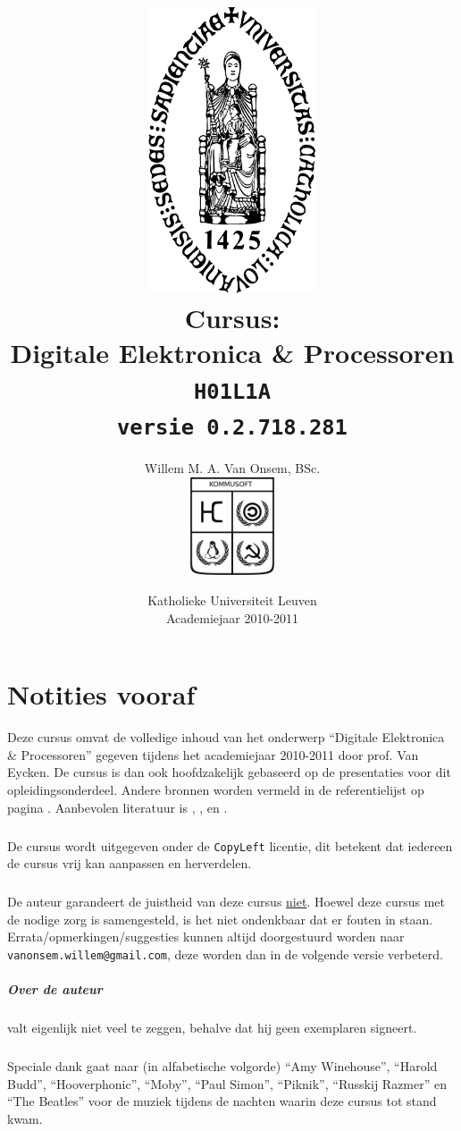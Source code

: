 \documentclass[a4paper,10pt,titlepage]{book}
\title{\includegraphics[width=5cm]{../SharedData/sedes.pdf}\\Cursus:\\Digitale Elektronica \& Processoren\\\texttt{H01L1A}\\\texttt{\small versie 0.2.718.281}}
\author{Willem M. A. Van Onsem, BSc.\\\includegraphics[width=2.5cm]{../SharedData/kommusoftEmblema.pdf}}
\date{Katholieke Universiteit Leuven\\Academiejaar 2010-2011}
\begin{document}
\frontmatter
\begin{titlepage}
\maketitle
\end{titlepage}
\tableofcontents
\chapter*{Notities vooraf}
\begin{it}
Deze cursus omvat de volledige inhoud van het onderwerp ``Digitale Elektronica \& Processoren'' gegeven tijdens het academiejaar 2010-2011 door prof. Van Eycken. De cursus is dan ook hoofdzakelijk gebaseerd op de presentaties voor dit opleidingsonderdeel. Andere bronnen worden vermeld in de referentielijst op pagina \pageref{reference}. Aanbevolen literatuur is \cite{brown2004fundamentals}, \cite{gajski1997principles}, \cite{wakerly2000digital} en \cite{ashenden2008designer}.
\paragraph{}
De cursus wordt uitgegeven onder de \texttt{CopyLeft} licentie, dit betekent dat iedereen de cursus vrij kan aanpassen en herverdelen.
\paragraph{}
De auteur garandeert de juistheid van deze cursus \underline{niet}. Hoewel deze cursus met de nodige zorg is samengesteld, is het niet ondenkbaar dat er fouten in staan. Errata/opmerkingen/suggesties kunnen altijd doorgestuurd worden naar \verb+vanonsem.willem@gmail.com+, deze worden dan in de volgende versie verbeterd.
\paragraph{Over de auteur}
valt eigenlijk niet veel te zeggen, behalve dat hij geen exemplaren signeert.
\paragraph{}
Speciale dank gaat naar (in alfabetische volgorde) ``Amy Winehouse'', ``Harold Budd'', ``Hooverphonic'', ``Moby'', ``Paul Simon'', ``Piknik'', ``Russkij Razmer'' en ``The Beatles'' voor de muziek tijdens de nachten waarin deze cursus tot stand kwam.

\end{it}
\end{document}
